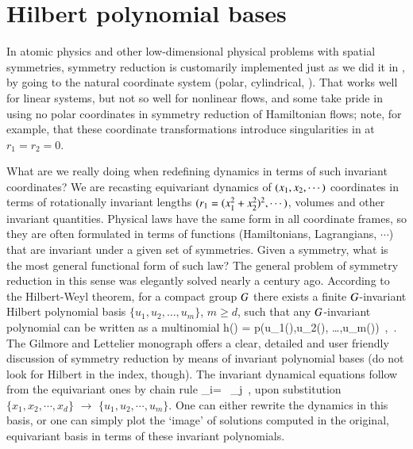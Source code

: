 \documentclass[final,number,sort&compress]{elsarticle}
\begin{document}
\section{\label{s:Hilbert} Hilbert polynomial bases}

In atomic physics and other low-dimensional physical problems
with spatial symmetries, symmetry reduction is customarily
implemented just as we did it in , by
going to the natural coordinate system (polar, cylindrical,
\etc). That works well for linear systems, but not so well
for nonlinear flows, and some take pride in
using no polar coordinates in symmetry reduction of
Hamiltonian flows; note, for
example, that these coordinate transformations introduce
singularities in  at $r_1=r_2=0$.

What are we really doing when redefining dynamics in terms of
such in\-vari\-ant coordinates? We are recasting
equi\-vari\-ant dynamics of $(x_1,x_2,\cdots)$
coordinates in terms of rotationally in\-vari\-ant lengths
$(r_1=(x_1^2+x_2^2)^2,\cdots)$, volumes and other
in\-vari\-ant quantities. Physical laws have the same form in
all coordinate frames, so they are often formulated in terms
of functions (Hamiltonians, Lagrangians, $\cdots$) {that are}
in\-vari\-ant under a given set of symmetries. Given a
symmetry, what is the most general functional form of such
law? The general problem of symmetry reduction in this sense
{was} elegantly solved nearly a century ago. According to the
Hilbert-Weyl theorem, for a compact group $G$ there
exists a finite $G${-in\-vari\-ant} Hilbert polynomial
basis $\{u_1,u_2, \dots,u_m\}$, $ m \geq d$, such that any
$G${-in\-vari\-ant} polynomial can be written as a
multinomial
\beq
h(\ssp) = p(u_1(\ssp),u_2(\ssp), \dots,u_m(\ssp))
    \,,\qquad \ssp \in \pS
\,.
The Gilmore and Lettelier monograph offers a
clear, detailed and user friendly discussion of symmetry
reduction by means of in\-vari\-ant polynomial bases (do not
look for Hilbert in the index, though). The in\-vari\-ant
dynamical equations follow from the equi\-vari\-ant ones by
chain rule
\beq
 _i= \, _j
 \,,
upon substitution $\{x_1,x_2,\cdots,x_d\}$ $\to$
$\{u_1,u_2,\cdots,u_m\}$. One can either rewrite the dynamics
in this basis, or one can simply plot the `image' of
solutions computed in the original, equi\-vari\-ant basis in
terms of these in\-vari\-ant polynomials.
\end{document}
